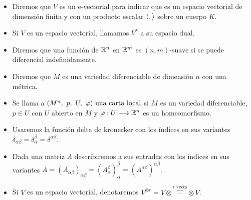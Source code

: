 \begin{itemize}
  \item Diremos que $V$ es un e-vectorial para indicar que es un espacio vectorial
  de dimensión finita y con un producto escalar $\langle , \rangle$ sobre un cuerpo $K$.
  \item Si $V$ es un espacio vectorial, llamamos $V^*$ a su espacio dual.
  \item Diremos que una función de $\mathbb{R}^n$ en $\mathbb{R}^m$ es $(n,m)$-suave si se puede diferencial indefinidamente.
  \item Diremos que $M$ es una variedad diferenciable de dimensión $n$ con una métrica.
  \item Se llama a $(M^n,\ p,\ U,\ \varphi)\textmd{ una carta local}$ si $M$ es un variedad diferenciable, $p\in U$ con $U$ abierto en $M$ y $\varphi:U\longrightarrow \mathbb{R}^n$ es un homeomorfismo.
  \item Usaremos la función delta de kronecker con los índices en sus variantes
  $\delta_{\alpha\beta}=\delta_\alpha^\beta=\delta^{\alpha\beta}$.
  \item Dada una matriz $A$ describiremos a sus entradas con los índices en sus variantes
  $A=(A_{\alpha\beta})_{\alpha\beta}=(A_\alpha^\beta)_\alpha^\beta=(A^{\alpha\beta})^{\alpha\beta}$.
  \item Si $V$ es un espacio vectorial, denotaremos
  $V^{\otimes r}=V\otimes\overbrace{\cdots}^\text{r\ veces}\otimes V$.
\end{itemize}
